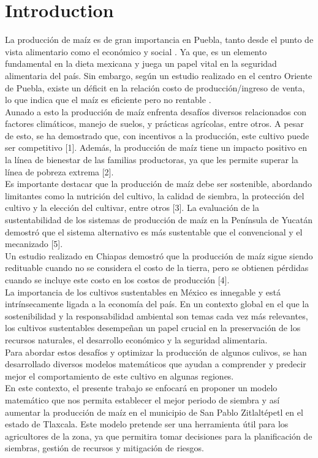\documentclass[utf8]{FrontiersinHarvard} %
\begin{document}
\section{Introduction}

La producción de maíz es de gran importancia en Puebla, tanto desde el punto de vista alimentario como el económico y social \citep{Zepeda2020LaPE}. 
Ya que, es un elemento fundamental en la dieta mexicana y juega un papel vital en la seguridad alimentaria del país. 
Sin embargo, según un estudio realizado en el centro Oriente de Puebla, existe un déficit en la relación costo de producción/ingreso de venta, 
lo que indica que el maíz es eficiente pero no rentable \citep{Cita1}.\\
Aunado a esto la producción de maíz enfrenta desafíos diversos relacionados con factores climáticos, manejo de suelos, y prácticas agrícolas, entre otros.  A pesar de esto, se ha demostrado que, con incentivos a la producción, este cultivo puede ser competitivo [1]. 
Además, la producción de maíz tiene un impacto positivo en la línea de bienestar de las familias productoras, ya que les permite superar la línea de pobreza extrema [2].\\
Es importante destacar que la producción de maíz debe ser sostenible, abordando limitantes como la nutrición del cultivo, la calidad de siembra, la protección del cultivo y la elección del cultivar, entre otros [3]. 
La evaluación de la sustentabilidad de los sistemas de producción de maíz en la Península de Yucatán demostró que el sistema alternativo es más sustentable que el convencional y el mecanizado [5].\\

Un estudio realizado en Chiapas demostró que la producción de maíz sigue siendo redituable cuando no se considera el costo de la tierra, pero se obtienen pérdidas cuando se incluye este costo en los costos de producción [4].
\\
La importancia de los cultivos sustentables en México es innegable y está intrínsecamente ligada a la economía del país. En un contexto global en el que la sostenibilidad y la responsabilidad ambiental son temas cada vez más relevantes, los cultivos sustentables desempeñan un papel crucial en la preservación de los recursos naturales, el desarrollo económico y la seguridad alimentaria.
\\
Para abordar estos desafíos y optimizar la producción de algunos culivos, se han desarrollado diversos modelos matemáticos que ayudan a comprender y predecir mejor el comportamiento de este cultivo en algunas regiones.
\\
En este contexto, el presente trabajo se enfocará en proponer un modelo matemático que nos permita establecer el mejor periodo de siembra y así aumentar la producción de maíz en el municipio de San Pablo Zitlaltépetl en el estado de Tlaxcala. Este modelo pretende ser una herramienta útil para los agricultores de la zona, ya que permitira tomar decisiones para la planificación de siembras, gestión de recursos y mitigación de riesgos.
\end{document}
